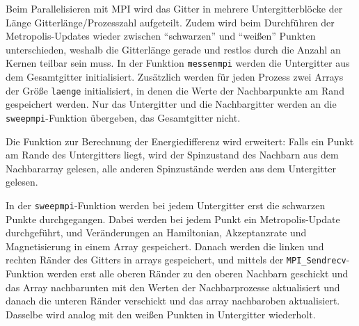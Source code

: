 	Beim Parallelisieren mit MPI wird das Gitter in mehrere Untergitterblöcke der Länge Gitterlänge/Prozesszahl aufgeteilt. Zudem wird beim Durchführen der Metropolis-Updates wieder zwischen \enquote{schwarzen} und \enquote{weißen} Punkten unterschieden, weshalb die Gitterlänge gerade und restlos durch die Anzahl an Kernen teilbar sein muss.
	In der Funktion \texttt{messenmpi} werden die Untergitter aus dem Gesamtgitter initialisiert. Zusätzlich werden für jeden Prozess zwei Arrays der Größe \texttt{laenge} initialisiert, in denen die Werte der Nachbarpunkte am Rand gespeichert werden. Nur das Untergitter und die Nachbargitter werden an die \texttt{sweepmpi}-Funktion übergeben, das Gesamtgitter nicht. 
	
	Die Funktion zur Berechnung der Energiedifferenz wird erweitert: Falls ein Punkt am Rande des Untergitters liegt, wird der Spinzustand des Nachbarn aus dem Nachbararray gelesen, alle anderen Spinzustände werden aus dem Untergitter gelesen.%
	
	In der \texttt{sweepmpi}-Funktion werden bei jedem Untergitter erst die schwarzen Punkte durchgegangen. Dabei werden bei jedem Punkt ein Metropolis-Update durchgeführt, und Veränderungen an Hamiltonian, Akzeptanzrate und Magnetisierung in einem Array gespeichert. Danach werden die linken und rechten Ränder des Gitters in arrays gespeichert, und mittels der \texttt{MPI\_Sendrecv}-Funktion werden erst alle oberen Ränder zu den oberen Nachbarn geschickt und das Array nachbarunten mit den Werten der Nachbarprozesse aktualisiert und danach die unteren Ränder verschickt und das array nachbaroben aktualisiert. Dasselbe wird analog mit den weißen Punkten in Untergitter wiederholt.
	
